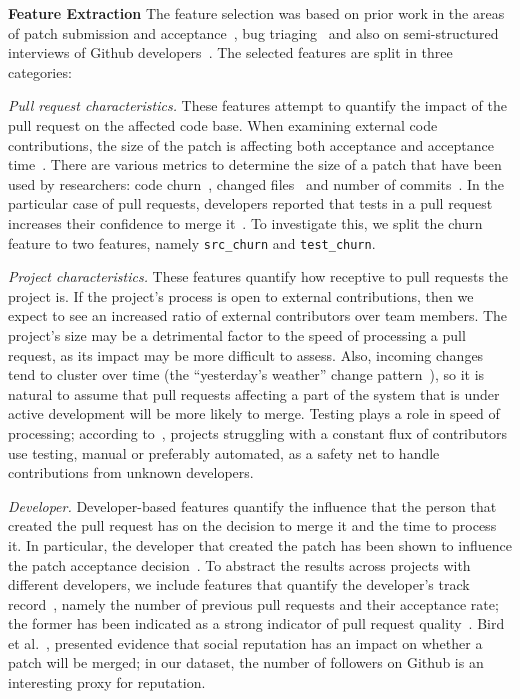 \documentclass{sig-alternate}
\begin{document}
\textbf{Feature Extraction} The feature selection was based on prior work in the areas of patch submission
and acceptance~\cite{Nagap05,Bird07a,Weiss08,Baysa12}, bug
triaging~\cite{Anvik06, Giger10} and also on semi-structured interviews of
Github developers~\cite{Dabbi12, Pham13}. The selected features are split
in three categories:

  \emph{Pull request characteristics.} These
    features attempt to quantify the impact of the
    pull request on the affected code base. When examining external code
    contributions, the size of the patch is affecting both acceptance and
    acceptance time~\cite{Weiss08}. There are various metrics to determine the
    size of a patch that have been used by researchers: code
    churn~\cite{Nagap05, Ratzi07}, changed files~\cite{Nagap05} and number of
    commits~\cite{Fluri07}. In the particular case of pull requests, developers
    reported that tests in a pull request increases their confidence to merge
    it~\cite{Pham13}. To investigate this, we split the churn feature to two
    features, namely \texttt{src\_churn} and \texttt{test\_churn}. 

  \emph{Project characteristics.} These features quantify how receptive to pull
  requests the project is. If the project's process is open to external
  contributions, then we expect to see an increased ratio of external
  contributors over team members. The project's size may be a detrimental factor
  to the speed of processing a pull request, as its impact may be more difficult
  to assess. Also, incoming changes tend to cluster over time (the ``yesterday's
  weather'' change pattern~\cite{Girba04}), so it is natural to assume that pull
  requests affecting a part of the system that is under active development will
  be more likely to merge. Testing plays a role in speed of processing;
  according to~\cite{Pham13}, projects struggling with a constant flux of
  contributors use testing, manual or preferably automated, as a safety net to
  handle contributions from unknown developers.

  \emph{Developer.}  Developer-based features quantify the influence that the
  person that created the pull request has on the decision to merge it and the
  time to process it. In particular, the developer that created the patch has
  been shown to influence the patch acceptance decision~\cite{Jeong09}. To
  abstract the results across projects with different developers, we include
  features that quantify the developer's track record~\cite{Dabbi12}, namely the
  number of previous pull requests and their acceptance rate; the former has
  been indicated as a strong indicator of pull request quality~\cite{Pham13}.
  Bird et al.~\cite{Bird07}, presented evidence that social reputation has an
  impact on whether a patch will be merged; in our dataset, the number of
  followers on Github is an interesting proxy for reputation.
\end{document}
